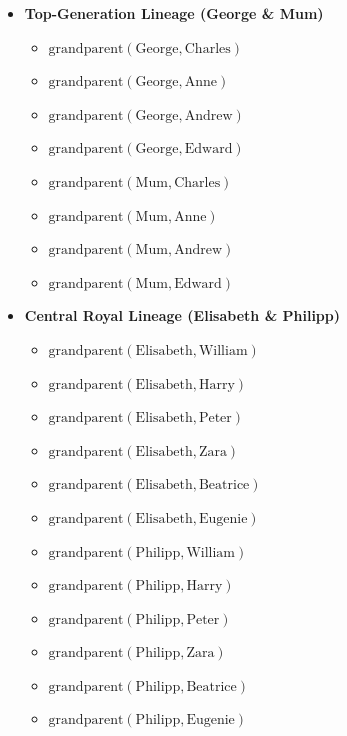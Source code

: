 \begin{itemize}
    \item \textbf{Top-Generation Lineage (George \& Mum)}
    \begin{itemize}
        \item $\text{grandparent}(\text{George}, \text{Charles})$
        \item $\text{grandparent}(\text{George}, \text{Anne})$
        \item $\text{grandparent}(\text{George}, \text{Andrew})$
        \item $\text{grandparent}(\text{George}, \text{Edward})$
        \item $\text{grandparent}(\text{Mum}, \text{Charles})$
        \item $\text{grandparent}(\text{Mum}, \text{Anne})$
        \item $\text{grandparent}(\text{Mum}, \text{Andrew})$
        \item $\text{grandparent}(\text{Mum}, \text{Edward})$
    \end{itemize}

    \item \textbf{Central Royal Lineage (Elisabeth \& Philipp)}
    \begin{itemize}
        \item $\text{grandparent}(\text{Elisabeth}, \text{William})$
        \item $\text{grandparent}(\text{Elisabeth}, \text{Harry})$
        \item $\text{grandparent}(\text{Elisabeth}, \text{Peter})$
        \item $\text{grandparent}(\text{Elisabeth}, \text{Zara})$
        \item $\text{grandparent}(\text{Elisabeth}, \text{Beatrice})$
        \item $\text{grandparent}(\text{Elisabeth}, \text{Eugenie})$
        \item $\text{grandparent}(\text{Philipp}, \text{William})$
        \item $\text{grandparent}(\text{Philipp}, \text{Harry})$
        \item $\text{grandparent}(\text{Philipp}, \text{Peter})$
        \item $\text{grandparent}(\text{Philipp}, \text{Zara})$
        \item $\text{grandparent}(\text{Philipp}, \text{Beatrice})$
        \item $\text{grandparent}(\text{Philipp}, \text{Eugenie})$
    \end{itemize}


\end{itemize}
